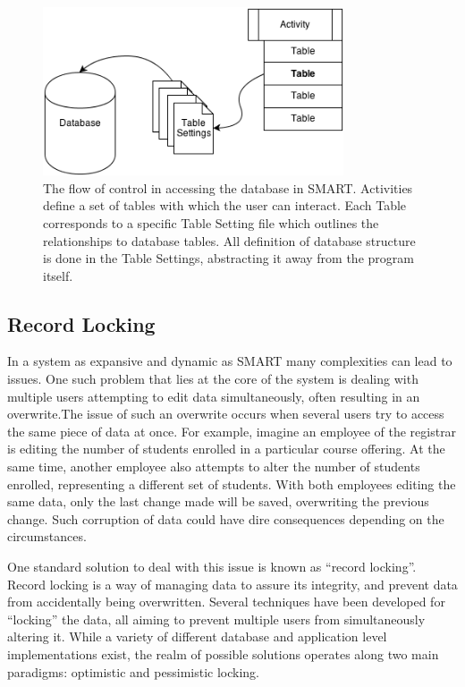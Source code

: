 \documentclass[12pt]{article}
\begin{document}
\begin{figure}[h]
    \begin{center}
        \centerline{\includegraphics[width=3.5in]{diagrams/SMARTAccess.png}}
    \end{center}
    \begin{spacing}{1.0}\caption{The flow of control in accessing the database in SMART. Activities define a set of tables with which the user can interact. Each Table corresponds to a specific Table Setting file which outlines the relationships to database tables. All definition of database structure is done in the Table Settings, abstracting it away from the program itself.}\end{spacing}
\end{figure}

\subsection{Record Locking}

In a system as expansive and dynamic as SMART many complexities can lead to issues. One such problem that lies at the core of the system is dealing with multiple users attempting to edit data simultaneously, often resulting in an overwrite.The issue of such an overwrite occurs when several users try to access the same piece of data at once. For example, imagine an employee of the registrar is editing the number of students enrolled in a particular course offering. At the same time, another employee also attempts to alter the number of students enrolled, representing a different set of students. With both employees editing the same data, only the last change made will be saved, overwriting the previous change. Such corruption of data could have dire consequences depending on the circumstances.  

One standard solution to deal with this issue is known as “record locking”. Record locking is a way of managing data to assure its integrity, and prevent data from accidentally being overwritten. Several techniques have been developed for “locking” the data, all aiming to prevent multiple users from simultaneously altering it. While a variety of different database and application level implementations exist, the realm of possible solutions operates along two main paradigms: optimistic and pessimistic locking. 
\end{document}
